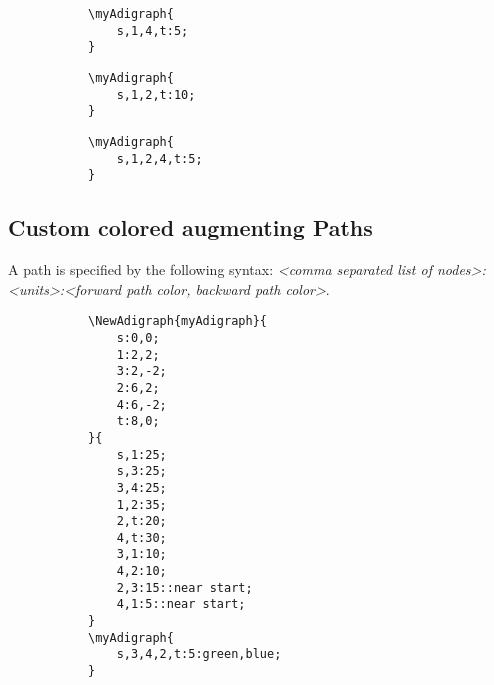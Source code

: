 \documentclass{report}
\begin{document}
\begin{figure}
	\begin{subfigure}{0.49\textwidth}
		\begin{verbatim}
\myAdigraph{
	s,1,4,t:5;
}
\end{verbatim}
	\end{subfigure}
	\begin{subfigure}{0.49\textwidth}
	\end{subfigure}
\end{figure}

\begin{figure}
	\begin{subfigure}{0.49\textwidth}
		\begin{verbatim}
\myAdigraph{
	s,1,2,t:10;
}
\end{verbatim}
	\end{subfigure}
	\begin{subfigure}{0.49\textwidth}
	\end{subfigure}
\end{figure}

\begin{figure}
	\begin{subfigure}{0.49\textwidth}
		\begin{verbatim}
\myAdigraph{
	s,1,2,4,t:5;
}
\end{verbatim}
	\end{subfigure}
	\begin{subfigure}{0.49\textwidth}
	\end{subfigure}
\end{figure}

\subsection{Custom colored augmenting Paths}
A path is specified by the following syntax: \textit{<comma separated list of nodes>:<units>:<forward path color, backward path color>}.


\begin{figure}
	\begin{subfigure}{0.49\textwidth}
		\begin{verbatim}
\NewAdigraph{myAdigraph}{
	s:0,0;
	1:2,2;
	3:2,-2;
	2:6,2;
	4:6,-2;
	t:8,0;
}{
	s,1:25;
	s,3:25;
	3,4:25;
	1,2:35;
	2,t:20;
	4,t:30;
	3,1:10;
	4,2:10;
	2,3:15::near start;
	4,1:5::near start;
}
\myAdigraph{
	s,3,4,2,t:5:green,blue;
}
\end{verbatim}
	\end{subfigure}
	\begin{subfigure}{0.49\textwidth}
	\end{subfigure}
\end{figure}
\end{document}
